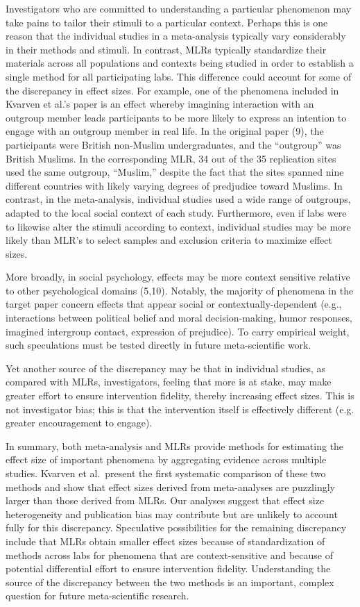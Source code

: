 \documentclass[12pt]{article}
\begin{document}
Investigators who are committed to understanding a particular phenomenon may take pains to tailor their stimuli to a particular context. Perhaps this is one reason that the individual studies in a meta-analysis typically vary considerably in their methods and stimuli. In contrast, MLRs typically standardize their materials across all populations and contexts being studied in order to establish a single method for all participating labs. This difference could account for some of the discrepancy in effect sizes. For example, one of the phenomena included in Kvarven et al.’s paper is an effect whereby imagining interaction with an outgroup member leads participants to be more likely to express an intention to engage with an outgroup member in real life. In the original paper (9), the participants were British non-Muslim undergraduates, and the “outgroup” was British Muslims. In the corresponding MLR, 34 out of the 35 replication sites used the same outgroup, “Muslim,” despite the fact that the sites spanned nine different countries with likely varying degrees of predjudice toward Muslims. In contrast, in the meta-analysis, individual studies used a wide range of outgroups, adapted to the local social context of each study. Furthermore, even if labs were to likewise alter the stimuli according to context, individual studies may be more likely than MLR's to select samples and exclusion criteria to maximize effect sizes.

More broadly, in social psychology, effects may be more context sensitive relative to other psychological domains (5,10). Notably, the majority of phenomena in the target paper concern effects that appear social or contextually-dependent (e.g., interactions between political belief and moral decision-making, humor responses, imagined intergroup contact, expression of prejudice). To carry empirical weight, such speculations must be tested directly in future meta-scientific work. 

Yet another source of the discrepancy may be that in individual studies, as compared with MLRs, investigators, feeling that more is at stake, may make greater effort to ensure intervention fidelity, thereby increasing effect sizes. This is not investigator bias; this is that the intervention itself is effectively different (e.g. greater encouragement to engage).

In summary, both meta-analysis and MLRs provide methods for estimating the effect size of important phenomena by aggregating evidence across multiple studies. Kvarven et al.\ present the first systematic comparison of these two methods and show that effect sizes derived from meta-analyses are puzzlingly larger than those derived from MLRs. Our analyses suggest that effect size heterogeneity and publication bias may contribute but are unlikely to account fully for this discrepancy. Speculative possibilities for the remaining discrepancy include that MLRs obtain smaller effect sizes because of standardization of methods across labs for phenomena that are context-sensitive and because of potential differential effort to ensure intervention fidelity. Understanding the source of the discrepancy between the two methods is an important, complex question for future meta-scientific research.
\end{document}
